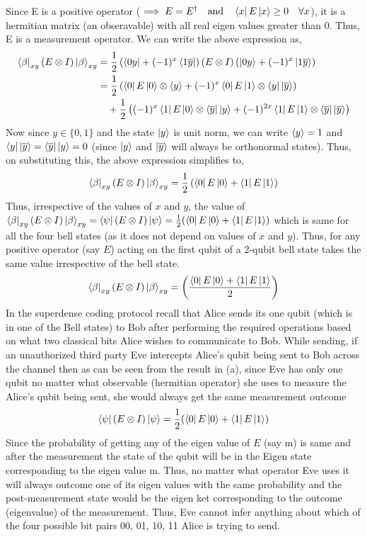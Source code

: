 \begin{example}
    Since E is a positive operator ($\implies E=E^{\dagger} \quad \text{and} \quad \bra{x}E\ket{x}\geq 0 \quad \forall x$), it is a hermitian matrix (an obseravable) with all real eigen values greater than 0. Thus, E is a measurement operator.
        We can write the above expression as,
        \begin{align*}
        \bra{\beta}_{xy}(E\otimes I)\ket{\beta}_{xy}&=\frac{1}{2}\left(\bra{0y}+(-1)^x\bra{1\overline{y}}\right)(E\otimes I)\left(\ket{0y}+(-1)^x\ket{1\overline{y}}\right)\\
        &=\frac{1}{2}\left(\bra{0}E\ket{0} \otimes \braket{y} + (-1)^x \bra{0}E\ket{1} \otimes \bra{y}\ket{\overline{y}} \right)\\
        & \quad + \frac{1}{2}\left((-1)^x\bra{1}E\ket{0} \otimes \bra{\overline{y}}\ket{y} + (-1)^{2x}\bra{1}E\ket{1} \otimes \bra{\overline{y}}\ket{\overline{y}} \right)
        \end{align*}
        Now since $ y \in \{0,1\}$ and the state $\ket{y}$ is unit norm, we can write $\braket{y}=1$ and $\bra{y}\ket{\overline{y}}=\bra{\overline{y}}\ket{y}=0$ (since $\ket{y}$ and $\ket{\overline{y}}$ will always be orthonormal states). Thus, on substituting this, the above expression simplifies to,
        \[
        \bra{\beta}_{xy}(E\otimes I)\ket{\beta}_{xy}=\frac{1}{2}\left(\bra{0}E\ket{0} + \bra{1}E\ket{1} \right)
        \]
        Thus, irrespective of the values of $x$ and $y$, the value of $\bra{\beta}_{xy}(E\otimes I)\ket{\beta}_{xy} = \bra{\psi}(E \otimes I)\ket{\psi}=\frac{1}{2}(\bra{0}E\ket{0}+\bra{1}E\ket{1})$ which is same for all the four bell states (as it does not depend on values of $x$ and $y$).
        Thus, for any positive operator (say $E$) acting on the first qubit of a 2-qubit bell state takes the same value irrespective of the bell state.
        \[
            \bra{\beta}_{xy}(E\otimes I)\ket{\beta}_{xy}=\left(\frac{\bra{0}E\ket{0} + \bra{1}E\ket{1} }{2}\right)
        \]
        In the superdense coding protocol recall that Alice sends its one qubit (which is in one of the Bell states) to Bob after performing the required operations based on what two classical bits Alice wishes to communicate to Bob. 
        While sending, if an unauthorized third party Eve intercepts Alice's qubit being sent to Bob across the channel then as can be seen from the result in (a), since Eve has only one qubit no matter what observable (hermitian operator) she uses to measure the Alice's qubit being sent, she would always get the same measurement outcome
        \[
        \bra{\psi}(E\otimes I)\ket{\psi}=\frac{1}{2}(\bra{0}E\ket{0}+\bra{1}E\ket{1})
        \]
        Since the probability of getting any of the eigen value of $E$ (say m) is same and after the measurement the state of the qubit will be in the 
        Eigen state corresponding to the eigen value m. Thus, no matter what operator Eve uses it will always outcome one of its eigen values with the same probability and the post-measurement state would be the eigen ket corresponding to the outcome (eigenvalue) of the measurement. Thus, Eve cannot infer anything about which of the four possible bit pairs 00, 01, 10, 11 Alice is trying to send.
\end{example}
